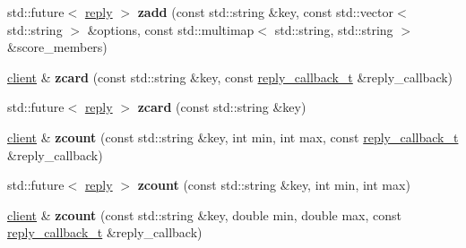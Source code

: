 \begin{DoxyCompactItemize}
\item 
\mbox{\label{classcpp__redis_1_1client_aa2df92b86ac0d55740fbe3548ed79443}} 
std\+::future$<$ \mbox{\hyperlink{classcpp__redis_1_1reply}{reply}} $>$ {\bfseries zadd} (const std\+::string \&key, const std\+::vector$<$ std\+::string $>$ \&options, const std\+::multimap$<$ std\+::string, std\+::string $>$ \&score\+\_\+members)
\item 
\mbox{\label{classcpp__redis_1_1client_a54259186a650211cc8b5fb70af1384ba}} 
\mbox{\hyperlink{classcpp__redis_1_1client}{client}} \& {\bfseries zcard} (const std\+::string \&key, const \mbox{\hyperlink{classcpp__redis_1_1client_af7a65eb21aa25230bfbb0b0203c4fc04}{reply\+\_\+callback\+\_\+t}} \&reply\+\_\+callback)
\item 
\mbox{\label{classcpp__redis_1_1client_a9cfeae7394f3fa2b3ff7ec1f1c56ca1b}} 
std\+::future$<$ \mbox{\hyperlink{classcpp__redis_1_1reply}{reply}} $>$ {\bfseries zcard} (const std\+::string \&key)
\item 
\mbox{\label{classcpp__redis_1_1client_a405463c110eb39e66163f0d936e42815}} 
\mbox{\hyperlink{classcpp__redis_1_1client}{client}} \& {\bfseries zcount} (const std\+::string \&key, int min, int max, const \mbox{\hyperlink{classcpp__redis_1_1client_af7a65eb21aa25230bfbb0b0203c4fc04}{reply\+\_\+callback\+\_\+t}} \&reply\+\_\+callback)
\item 
\mbox{\label{classcpp__redis_1_1client_a7965bc6ab1198ca3bb5b31c10da95c34}} 
std\+::future$<$ \mbox{\hyperlink{classcpp__redis_1_1reply}{reply}} $>$ {\bfseries zcount} (const std\+::string \&key, int min, int max)
\item 
\mbox{\label{classcpp__redis_1_1client_a648afc3a38da6413e6b735d2708c3fe3}} 
\mbox{\hyperlink{classcpp__redis_1_1client}{client}} \& {\bfseries zcount} (const std\+::string \&key, double min, double max, const \mbox{\hyperlink{classcpp__redis_1_1client_af7a65eb21aa25230bfbb0b0203c4fc04}{reply\+\_\+callback\+\_\+t}} \&reply\+\_\+callback)
\item 
\mbox{\label{classcpp__redis_1_1client_a7d3ddea81b718564c060a51575d8c127}} 

\end{DoxyCompactItemize}
